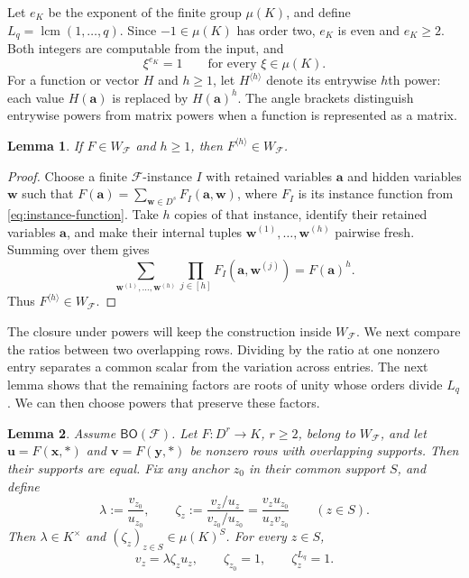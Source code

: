 \documentclass[11pt,letterpaper,onecolumn]{article}
\theoremstyle{plain}
\newtheorem{lemma}[lemma]{Lemma}
\theoremstyle{definition}
\theoremstyle{remark}
\newcommand{\cF}{\mathcal F}
\newcommand{\BO}{\mathsf{BO}}
\newcommand{\Pow}[2]{#1^{\langle #2\rangle}}
\DeclareMathOperator{\lcm}{lcm}
\begin{document}
Let $e_K$ be the exponent of the finite group $\mu(K)$, and define $L_q=\lcm(1,\ldots,q)$. Since $-1\in\mu(K)$ has order two, $e_K$ is even and $e_K\ge2$.
Both integers are computable from the input, and
\begin{equation}
  \xi^{e_K}=1
  \qquad\text{for every }\xi\in\mu(K).
  \label{eq:Kmu-kills-torsion}
\end{equation}
For a function or vector $H$ and $h\ge1$, let $\Pow{H}{h}$ denote its entrywise
$h$th power: each value $H(\mathbf a)$ is replaced by
$H(\mathbf a)^h$.  The angle brackets distinguish entrywise powers from
matrix powers when a function is represented as a matrix.

\begin{lemma}
\label{lem:generated-entrywise-powers}
If $F\in W_{\cF}$ and $h\ge1$, then $\Pow{F}{h}\in W_{\cF}$.
\end{lemma}

\begin{proof}
Choose a finite $\cF$-instance $I$ with retained variables $\mathbf a$
and hidden variables $\mathbf w$ such that $F(\mathbf a)=\sum_{\mathbf w\in D^s}F_I(\mathbf a,\mathbf w)$, where $F_I$ is its instance function from \eqref{eq:instance-function}.
Take $h$ copies of that instance, identify their retained variables
$\mathbf a$, and make their internal tuples
$\mathbf w^{(1)},\ldots,\mathbf w^{(h)}$ pairwise fresh.  Summing over them
gives
\[
  \sum_{\mathbf w^{(1)},\ldots,\mathbf w^{(h)}}
     \prod_{j\in[h]}F_I(\mathbf a,\mathbf w^{(j)})
  =F(\mathbf a)^h.
\]
Thus $\Pow{F}{h}\in W_{\cF}$.
\end{proof}

The closure under powers will keep the construction inside $W_{\cF}$.
We next compare the ratios between two overlapping rows.  Dividing by the
ratio at one nonzero entry separates a common scalar from the variation
across entries.  The next lemma shows that the remaining factors are roots
of unity whose orders divide $L_q$.  We can then choose powers that
preserve these factors.

\begin{lemma}
\label{lem:finite-row-phases}
Assume $\BO(\cF)$.  Let $F:D^r\to K$, $r\ge2$, belong to $W_{\cF}$, and
let $\mathbf u=F(\mathbf x,\ast)$ and
$\mathbf v=F(\mathbf y,\ast)$ be nonzero rows with overlapping supports.
Then their supports are equal.  Fix any anchor $z_0$ in their common support
$S$, and define
\begin{equation}
  \lambda:=\frac{v_{z_0}}{u_{z_0}},
  \qquad
  \zeta_z:=
    \frac{v_z/u_z}{v_{z_0}/u_{z_0}}
    =\frac{v_zu_{z_0}}{u_zv_{z_0}}
  \qquad(z\in S).
  \label{eq:anchored-row-phases}
\end{equation}
Then $\lambda\in K^\times$ and
$(\zeta_z)_{z\in S}\in\mu(K)^S$.  For every $z\in S$,
\begin{equation}
  v_z=\lambda\zeta_z u_z,
  \qquad
  \zeta_{z_0}=1,
  \qquad
  \zeta_z^{L_q}=1.
  \label{eq:finite-row-phases}
\end{equation}
\end{lemma}
\end{document}

